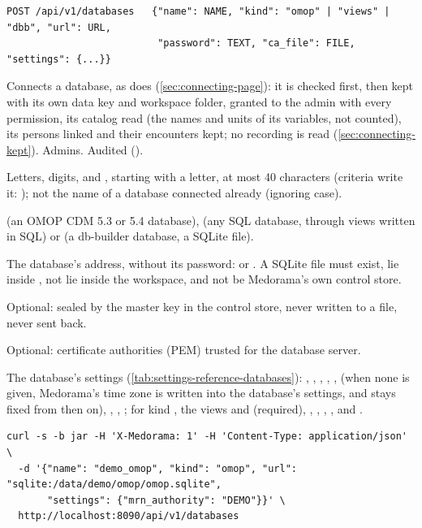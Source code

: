 \begin{lstlisting}[style=signature]
POST /api/v1/databases   {"name": NAME, "kind": "omop" | "views" | "dbb", "url": URL,
                          "password": TEXT, "ca_file": FILE, "settings": {...}}
\end{lstlisting}
Connects a database, as  does (\cref{sec:connecting-page}): it is
checked first, then kept with its own data key and workspace folder, granted to the admin with
every permission, its catalog read (the names and units of its variables, not counted), its
persons linked and their encounters kept; no recording is read (\cref{sec:connecting-kept}). Admins.
Audited ().
\begin{params}
\item[name] Letters, digits, \code{-} and \code{\_}, starting with a letter, at most 40
  characters (criteria write it: ); not the name of a database connected
  already (ignoring case).
\item[kind]  (an OMOP CDM 5.3 or 5.4 database),  (any SQL database,
  through views written in SQL) or  (a db-builder database, a SQLite file).
\item[url] The database's address, without its password:  or
  . A SQLite file must exist, lie inside , not lie inside the
  workspace, and not be Medorama's own control store.
\item[password] Optional: sealed by the master key in the control store, never written to a
  file, never sent back.
\item[ca\_file] Optional: certificate authorities (PEM) trusted for the database server.
\item[settings] The database's settings (\cref{tab:settings-reference-databases}):
  , , , ,
  ,  (when none is given, Medorama's time zone is written
  into the database's settings, and stays fixed from then on), ,
  , ; for kind , the views  and
   (required), , , , ,
   and .
\end{params}
\begin{lstlisting}[style=shell]
curl -s -b jar -H 'X-Medorama: 1' -H 'Content-Type: application/json' \
  -d '{"name": "demo_omop", "kind": "omop", "url": "sqlite:/data/demo/omop/omop.sqlite",
       "settings": {"mrn_authority": "DEMO"}}' \
  http://localhost:8090/api/v1/databases
\end{lstlisting}


